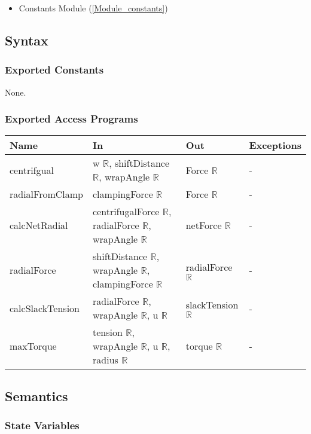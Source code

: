 \documentclass[12pt, titlepage]{article}
\begin{document}
\begin{itemize}
  \item Constants Module (\ref{Module_constants})
\end{itemize}
\subsection{Syntax}

\subsubsection{Exported Constants}
None.

\subsubsection{Exported Access Programs}

\begin{center}
\begin{tabular}{p{3cm} p{4cm} p{4cm} p{2cm}}
\hline
\textbf{Name} & \textbf{In} & \textbf{Out} & \textbf{Exceptions} \\
\hline
centrifgual & w $\mathbb{R}$, shiftDistance $\mathbb{R}$, wrapAngle $\mathbb{R}$  & Force $\mathbb{R}$ & - \\
radialFromClamp & clampingForce $\mathbb{R}$ & Force $\mathbb{R}$ & - \\
calcNetRadial & centrifugalForce $\mathbb{R}$, radialForce $\mathbb{R}$, wrapAngle $\mathbb{R}$ & netForce $\mathbb{R}$ & - \\
radialForce & shiftDistance $\mathbb{R}$, wrapAngle $\mathbb{R}$, clampingForce $\mathbb{R}$& radialForce $\mathbb{R}$ & - \\
calcSlackTension & radialForce $\mathbb{R}$, wrapAngle $\mathbb{R}$, u $\mathbb{R}$ & slackTension $\mathbb{R}$ & - \\
maxTorque & tension $\mathbb{R}$, wrapAngle $\mathbb{R}$, u $\mathbb{R}$, radius $\mathbb{R}$ & torque $\mathbb{R}$ & - \\
\hline
\end{tabular}
\end{center}

\subsection{Semantics}

\subsubsection{State Variables}
\end{document}
